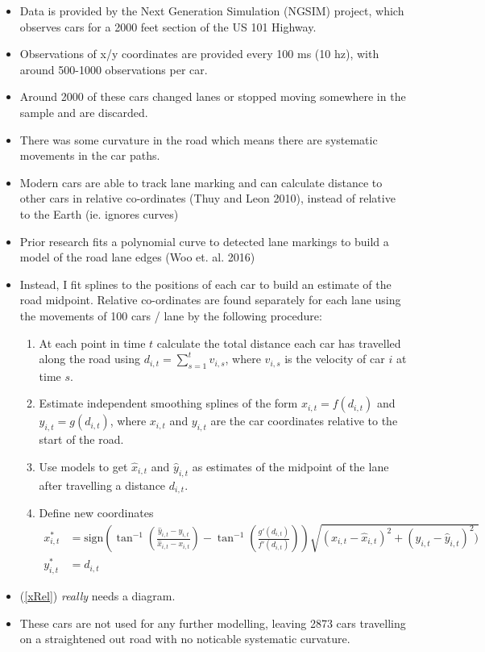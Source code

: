 \documentclass[12pt,a4paper]{article}\usepackage[]{graphicx}\usepackage[]{color}
\begin{document}
\begin{itemize}
\item Data is provided by the Next Generation Simulation (NGSIM) project, which observes cars for a 2000 feet section of the US 101 Highway.
\item Observations of x/y coordinates are provided every 100 ms (10 hz), with around 500-1000 observations per car.
\item Around 2000 of these cars changed lanes or stopped moving somewhere in the sample and are discarded.
\item There was some curvature in the road which means there are systematic movements in the car paths.
\item Modern cars are able to track lane marking and can calculate distance to other cars in relative co-ordinates (Thuy and Leon 2010), instead of relative to the Earth (ie. ignores curves)
\item Prior research fits a polynomial curve to detected lane markings to build a model of the road lane edges (Woo et. al. 2016) 
\item Instead, I fit splines to the positions of each car to build an estimate of the road midpoint. Relative co-ordinates are found separately for each lane using the movements of 100 cars / lane by the following procedure:
\begin{enumerate}
\item At each point in time $t$ calculate the total distance each car has travelled along the road using $d_{i, t} = \sum_{s=1}^t v_{i, s}$, where $v_{i, s}$ is the velocity of car $i$ at time $s$. 
\item Estimate independent smoothing splines of the form $x_{i, t} = f(d_{i, t})$ and $y_{i, t} = g(d_{i, t})$, where $x_{i, t}$ and $y_{i, t}$ are the car coordinates relative to the start of the road.
\item Use models to get $\hat{x}_{i, t}$ and $\hat{y}_{i, t}$ as estimates of the midpoint of the lane after travelling a distance $d_{i, t}$.
\item Define new coordinates 
\begin{align}
x^*_{i, t} &= \mbox{sign}\left(\tan^{-1}\left(\frac{\hat{y}_{i, t} - y_{i, t}}{\hat{x}_{i, t} - x_{i, t}} \right) - \tan^{-1}\left(\frac{g'(d_{i, t}) }{f'(d_{i, t})}\right)\right)\sqrt{(x_{i, t}-\hat{x}_{i, t})^2 + (y_{i, t} - \hat{y}_{i, t})^2)} \label{xRel} \\
y^*_{i, t} &= d_{i, t} \label{yRel}
\end{align}
\end{enumerate}
\item (\ref{xRel}) \textit{really} needs a diagram.
\item These cars are not used for any further modelling, leaving 2873 cars travelling on a straightened out road with no noticable systematic curvature.
\end{itemize}
\end{document}
